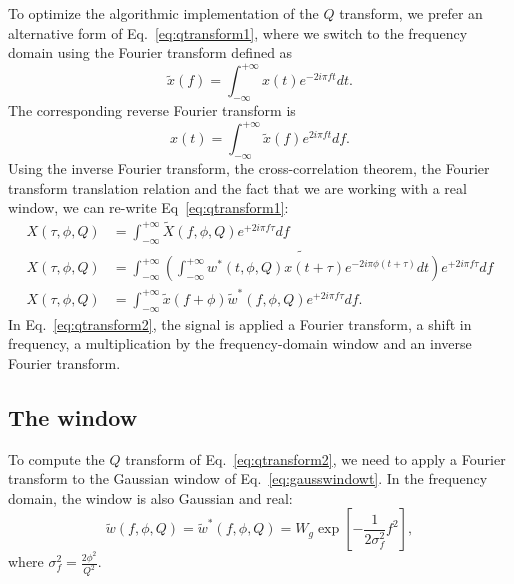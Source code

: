 To optimize the algorithmic implementation of the $Q$ transform, we prefer an alternative form of Eq.~\ref{eq:qtransform1}, where we switch to the frequency domain using the Fourier transform defined as
\begin{equation}
  \tilde{x}(f) = \int_{-\infty}^{+\infty}{ x(t) e^{-2i\pi f t}dt}. \label{eq:FTforward}
\end{equation}
The corresponding reverse Fourier transform is
\begin{equation}
  x(t) = \int_{-\infty}^{+\infty}{ \tilde{x}(f) e^{2i\pi f t}df}.  \label{eq:FTbackward}
\end{equation}
Using the inverse Fourier transform, the cross-correlation theorem, the Fourier transform translation relation and the fact that we are working with a real window, we can re-write Eq~\ref{eq:qtransform1}:
\begin{align}
  X(\tau, \phi, Q) &= \int_{-\infty}^{+\infty}{\tilde{X}(f,\phi,Q) e^{+2i\pi f \tau}df} \\
  X(\tau, \phi, Q) &= \int_{-\infty}^{+\infty}{ \widetilde{\left (\int_{-\infty}^{+\infty}{w^*(t,\phi,Q)x(t+\tau)e^{-2i\pi\phi(t+\tau)}dt}\right)} e^{+2i\pi f \tau}df}\\
  X(\tau, \phi, Q) &= \int_{-\infty}^{+\infty}{ \tilde{x}(f+\phi) \tilde{w}^{*}(f,\phi,Q) e^{+2i\pi f \tau}df}.
  \label{eq:qtransform2}
\end{align}
In Eq.~\ref{eq:qtransform2}, the signal is applied a Fourier transform, a shift in frequency, a multiplication by the frequency-domain window and an inverse Fourier transform.


\subsection{The window} \label{sec:method:window}
To compute the $Q$ transform of Eq.~\ref{eq:qtransform2}, we need to apply a Fourier transform to the Gaussian window of Eq.~\ref{eq:gausswindowt}. In the frequency domain, the window is also Gaussian and real:
\begin{equation}
  \tilde{w}(f,\phi,Q) = \tilde{w}^*(f,\phi,Q) = W_g\exp\left [ -\frac{1}{2\sigma_f^2}f^2 \right],
  \label{eq:gausswindowf}
\end{equation}
where $\sigma_f^2=\frac{2\phi^2}{Q^2}$.

